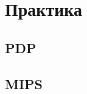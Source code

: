 \documentclass[a4paper,12pt,ukrainian,oneside]{book}
\begin{document}
\tableofcontents
\chapter{Практика}
\section{PDP}


\section{MIPS}


\end{document}
